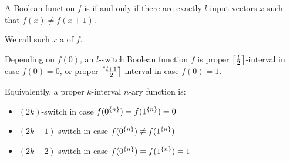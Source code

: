 \begin{definition}
A Boolean function $f$ is 
if and only if
there are exactly $l$ input vectors $x$ such that
$f(x) \neq f(x+1)$.

We call such $x$ a  of $f$.
\end{definition}

\begin{example}
\label{example:switchesintervals}
Depending on $f(0)$,
an $l$-switch Boolean function $f$
is proper $\ceil*{\frac{l}{2}}$-interval
in case $f(0) = 0$,
or proper $\ceil*{\frac{l+1}{2}}$-interval
in case $f(0) = 1$.

Equivalently,
a proper $k$-interval $n$-ary function is:
\begin{itemize}
\item
$(2k)$-switch in case $f(\rep{0}{n}) = f(\rep{1}{n}) = 0$
\item
$(2k-1)$-switch in case $f(\rep{0}{n}) \neq f(\rep{1}{n})$
\item
$(2k-2)$-switch in case $f(\rep{0}{n}) = f(\rep{1}{n}) = 1$
\end{itemize}
\end{example}

